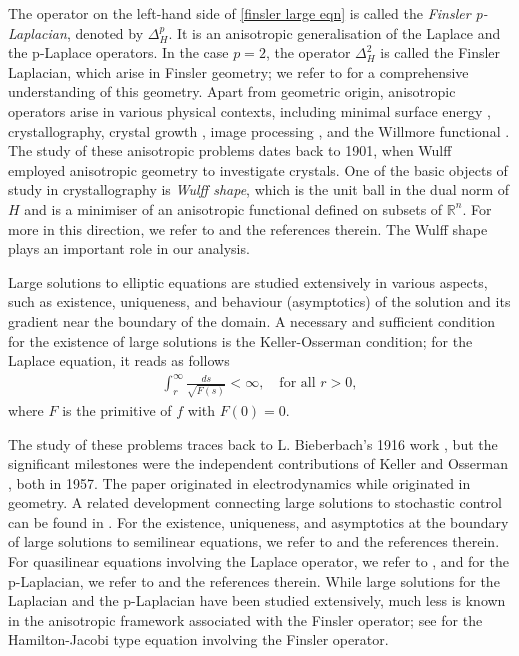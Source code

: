 \documentclass[11pt]{amsart}
\newcommand{\R}{\mathbb{R}}
\numberwithin{equation}{section}
\begin{document}
The operator on the left-hand side of \eqref{finsler large eqn} is called the \textit{Finsler p-Laplacian}, denoted by $\Delta_{H}^{p}$.
 It is an anisotropic generalisation of the Laplace and the p-Laplace operators. In the case $p=2$, the operator $\Delta _{H}^{2}$ is called the Finsler Laplacian, which arise in Finsler geometry; we refer to \cite{BaoChernShen2000} for a comprehensive understanding of this geometry. Apart from geometric origin, anisotropic operators arise in various physical contexts, including minimal surface energy \cite{Taylor1978}, crystallography, crystal growth \cite{TaylorChanHandwerker1992}, image processing \cite{RudinOsherFatemi1992}, and the Willmore functional \cite{Ulrich2004}. The study of these anisotropic problems dates back to 1901, when Wulff \cite{Wulff1901} employed anisotropic geometry to investigate crystals. One of the basic objects of study in crystallography is \textit{Wulff shape}, which is the unit ball in the dual norm of $H$ and is a minimiser of an anisotropic functional defined on subsets of $\R^{n}$. For more in this direction, we refer to \cite{CozziFarinaValdinoci2014, Ulrich2004} and the references therein. The Wulff shape plays an important role in our analysis.

Large solutions to elliptic equations are studied extensively in various aspects, such as existence, uniqueness, and behaviour (asymptotics) of the solution and its gradient near the boundary of the domain. A necessary and sufficient condition for the existence of large solutions is the Keller-Osserman condition; for the Laplace equation, it reads as follows  
\begin{align*}
    \int^{\infty}_{r}\frac{ds}{\sqrt{F(s)}}<\infty,\quad \text{for all } r>0,
\end{align*}
where $F$ is the primitive of $f$ with $F(0)=0$.


The study of these problems traces back to L. Bieberbach’s 1916 work \cite{biberbach}, but the significant milestones were the independent contributions of Keller \cite{Keller1957} and Osserman \cite{Osserman1957}, both in 1957. The paper \cite{Keller1957} originated in electrodynamics \cite{osti_4157678} while \cite{Osserman1957} originated in geometry. A related development connecting large solutions to stochastic control can be found in \cite{lions}. For the existence, uniqueness, and asymptotics at the boundary of large solutions to semilinear equations, we refer to \cite{BandleMarcus1992, BandleMarcus1995, McKenna} and the references therein. For quasilinear equations involving the Laplace operator, we refer to \cite{BandleAntonioPorru1997, Lieberman}, and for the p-Laplacian, we refer to \cite{DattaIndro2026, diaz1993, materopaper} and the references therein.
While large solutions for the Laplacian and the p-Laplacian have been studied extensively, much less is known in the anisotropic framework associated with the Finsler operator; see \cite{DellaBlasio2017} for the Hamilton-Jacobi type equation involving the Finsler operator.
\end{document}

